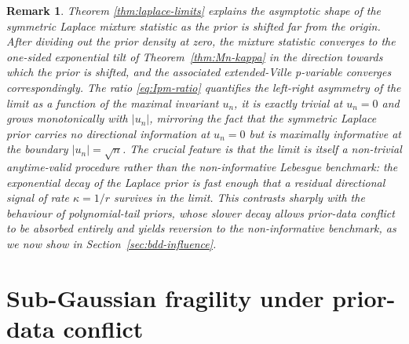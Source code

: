 \documentclass[numsec,webpdf,modern,medium,namedate]{oup-authoring-template}
\theoremstyle{thmstyleone}%
\theoremstyle{thmstyletwo}%
\newtheorem{remark}{Remark}%
\theoremstyle{thmstylethree}%
\newcommand{\1}{\mathbf{1}}
\begin{document}
\begin{remark}
Theorem \ref{thm:laplace-limits} explains the asymptotic shape of the symmetric Laplace mixture statistic as the prior is shifted far from the origin. After dividing out the prior density at zero, the mixture statistic converges to the one-sided exponential tilt of Theorem~\ref{thm:Mn-kappa} in the direction towards which the prior is shifted, and the associated extended-Ville p-variable converges correspondingly. The ratio \eqref{eq:Ipm-ratio} quantifies the left-right asymmetry of the limit as a function of the maximal invariant $u_n$, it is exactly trivial at $u_n=0$ and grows monotonically with $|u_n|$, mirroring the fact that the symmetric Laplace prior carries no directional information at $u_n=0$ but is maximally informative at the boundary $|u_n|=\sqrt n$. The crucial feature is that the limit is itself a non-trivial anytime-valid procedure rather than the non-informative Lebesgue benchmark: the exponential decay of the Laplace prior is fast enough that a residual directional signal of rate $\kappa = 1/r$ survives in the limit. This contrasts sharply with the behaviour of polynomial-tail priors, whose slower decay allows prior-data conflict to be absorbed entirely and yields reversion to the non-informative benchmark, as we now show in Section~\ref{sec:bdd-influence}.
\end{remark}

\section{Sub-Gaussian fragility under prior-data conflict}
\end{document}
